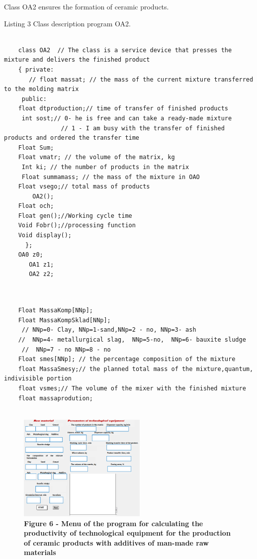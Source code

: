 Class OA2 ensures the formation of ceramic products.

Listing 3 Class description program OA2.

\begin{lstlisting}

	class OA2  // The class is a service device that presses the mixture and delivers the finished product
	{ private:
	   // float massat; // the mass of the current mixture transferred to the molding matrix
	 public:
	float dtproduction;// time of transfer of finished products
	 int sost;// 0- he is free and can take a ready-made mixture
				// 1 - I am busy with the transfer of finished products and ordered the transfer time
	Float Sum;
	Float vmatr; // the volume of the matrix, kg
	 Int ki; // the number of products in the matrix
	 Float summamass; // the mass of the mixture in ОАО
	Float vsego;// total mass of products
		OA2();
	Float och;
	Float gen();//Working cycle time
	Void Fobr();//processing function
	Void display();
	  };
	OA0 z0;
	   OA1 z1;
	   OA2 z2;
	

\end{lstlisting}

\begin{lstlisting}

	Float MassaKomp[NNp];
	Float MassaKompSklad[NNp];
	 // NNp=0- Clay, NNp=1-sand,NNp=2 - no, NNp=3- ash
	//  NNp=4- metallurgical slag,  NNp=5-no,  NNp=6- bauxite sludge 
	 //  NNp=7 - no NNp=8 - no
	Float smes[NNp]; // the percentage composition of the mixture
	float MassaSmesy;// the planned total mass of the mixture,quantum, indivisible portion
	float vsmes;// The volume of the mixer with the finished mixture
	float massaprodution;
	
\end{lstlisting}


\begin{figure}[H]
	\centering
	\includegraphics[width=0.55\textwidth]{assets/272}
	\caption*{\bfseries Figure 6 - Menu of the program for calculating the productivity of technological equipment for the production of ceramic
	products with additives of man-made raw materials}
\end{figure}



